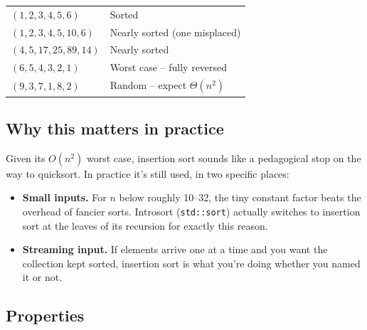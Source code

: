 \documentclass[11pt]{article}
\begin{document}
\begin{examplebox}
\begin{center}
\footnotesize
\begin{tabular}{@{}lp{7.5cm}@{}}
\hline
$(1, 2, 3, 4, 5, 6)$                                     & Sorted \\
$(1, 2, 3, 4, 5, 10, 6)$                                 & Nearly sorted (one misplaced) \\
$(4, 5, 17, 25, 89, 14)$                                 & Nearly sorted \\
$(6, 5, 4, 3, 2, 1)$                                     & Worst case -- fully reversed \\
$(9, 3, 7, 1, 8, 2)$                                     & Random -- expect $\Theta(n^2)$ \\
\hline
\end{tabular}
\end{center}
\end{examplebox}

\subsection{Why this matters in practice}

\begin{ideabox}
Given its $O(n^2)$ worst case, insertion sort sounds like a
pedagogical stop on the way to quicksort. In practice it's still
used, in two specific places:
\begin{itemize}[leftmargin=*]
  \item \textbf{Small inputs.} For $n$ below roughly 10--32, the
        tiny constant factor beats the overhead of fancier sorts.
        Introsort (\texttt{std::sort}) actually switches to
        insertion sort at the leaves of its recursion for exactly
        this reason.
  \item \textbf{Streaming input.} If elements arrive one at a time
        and you want the collection kept sorted, insertion sort is
        what you're doing whether you named it or not.
\end{itemize}
\end{ideabox}

\subsection{Properties}
\end{document}
